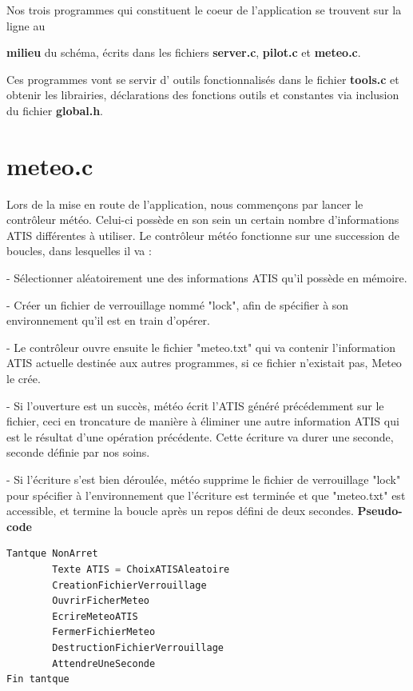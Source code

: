 \documentclass{report}
\begin{document}
		Nos trois programmes qui constituent le coeur de l'application se trouvent sur la ligne au {\textbf{milieu} du schéma, écrits dans les fichiers {\textbf{\color{red} server.c}}, {      \textbf{\color{red} pilot.c}} et {\textbf{\color{red} meteo.c}}.

		Ces programmes vont se servir d' \og outils \fg fonctionnalisés dans le fichier {\textbf{\color{red} tools.c}} et obtenir les librairies, déclarations des fonctions outils et constantes  via inclusion du fichier {\textbf{\color{black} global.h}}.

	\section{meteo.c}

		Lors de la mise en route de l'application, nous commençons par lancer le contrôleur météo.
		Celui-ci possède en son sein un certain nombre d'informations ATIS différentes à utiliser.
		Le contrôleur météo fonctionne sur une succession de boucles, dans lesquelles il va :

		- Sélectionner aléatoirement une des informations ATIS qu'il possède en mémoire.

		- Créer un fichier de verrouillage nommé "lock", afin de spécifier à son environnement qu'il est en train d'opérer.

		- Le contrôleur ouvre ensuite le fichier "meteo.txt" qui va contenir l'information ATIS actuelle destinée aux autres programmes, si ce fichier n'existait pas, Meteo le crée.

		- Si l'ouverture est un succès, météo écrit l'ATIS généré précédemment sur le fichier, ceci en troncature de manière à éliminer une autre information ATIS qui est le résultat d'une opération précédente. Cette écriture va durer une seconde, seconde définie par nos soins.

		- Si l'écriture s'est bien déroulée, météo supprime le fichier de verrouillage "lock" pour spécifier à l'environnement que l'écriture est terminée et que "meteo.txt" est accessible, et termine la boucle après un repos défini de deux secondes.
\clearpage
\textbf{Pseudo-code}

\begin{lstlisting}[language=C]
Tantque NonArret
		Texte ATIS = ChoixATISAleatoire
		CreationFichierVerrouillage
		OuvrirFicherMeteo
		EcrireMeteoATIS
		FermerFichierMeteo
		DestructionFichierVerrouillage
		AttendreUneSeconde
Fin tantque 
\end{lstlisting}

}
\end{document}
